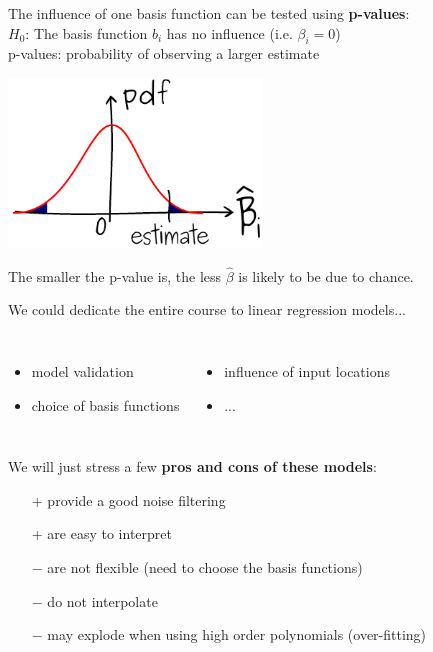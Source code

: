 \begin{frame}{}
The influence of one basis function can be tested using \textbf{p-values}:\\
\qquad $H_0$: The basis function $b_i$ has no influence (i.e. $\beta_i=0$)\\
\qquad p-values: probability of observing a larger estimate
\begin{center}
  \includegraphics[height=4.5cm]{1_stat_models/figures/ink_pvalue}
\end{center}
The smaller the p-value is, the less $\hat{\beta}$ is likely to be due to chance.
\end{frame}

\begin{frame}{}
We could dedicate the entire course to linear regression models...
\begin{columns}[c]
\column{5cm}
\begin{itemize}
	\item model validation
	\item choice of basis functions
\end{itemize}
\column{6cm}
\begin{itemize}
	\item influence of input locations
	\item ...
\end{itemize}
\end{columns}
\vspace{10mm}
We will just stress a few \textbf{pros and cons of these models}:
\begin{itemize}
  \item[+] provide a good noise filtering
  \item[+] are easy to interpret
  \item[] \vspace{-5mm}
  \item[$-$] are not flexible (need to choose the basis functions)
  \item[$-$] do not interpolate
  \item[$-$] may explode when using high order polynomials (over-fitting)
\end{itemize}
\end{frame}

